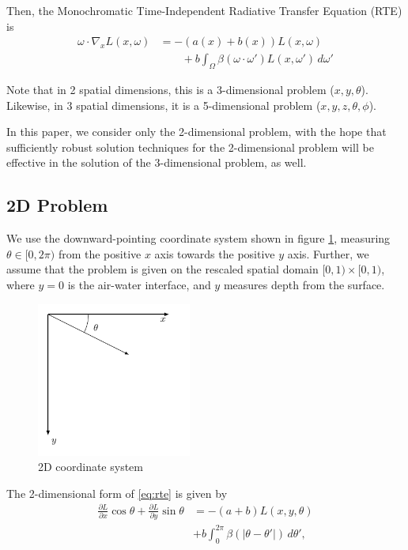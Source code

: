\documentclass[10pt]{article}
\newcommand\abs[1]{\left| #1 \right|}
\newcommand\pd[2]{\frac{\partial #1}{\partial #2}}
\begin{document}
\begin{multicols}{2}
Then, the Monochromatic Time-Independent Radiative Transfer Equation (RTE) is
\begin{equation}
    \tag{RTE}
    \label{eq:rte}
    \begin{aligned}
        \omega \cdot \nabla_x L(x,\omega) &= -(a(x) + b(x)) L(x,\omega) \\
        &\qquad + b \int_\Omega \beta(\omega \cdot \omega') L(x,\omega')\, d\omega'
    \end{aligned}
\end{equation}

Note that in 2 spatial dimensions, this is a 3-dimensional problem ($x,y,\theta$).
Likewise, in 3 spatial dimensions, it is a 5-dimensional problem ($x,y,z,\theta,\phi$).

In this paper, we consider only the 2-dimensional problem, with the hope that sufficiently robust solution techniques for the 2-dimensional problem will be effective in the solution of the 3-dimensional problem, as well.

\subsection{2D Problem}
\label{sec:2d}
We use the downward-pointing coordinate system shown in figure \ref{fig:coords}, measuring $\theta \in [0,2\pi)$ from the positive $x$ axis towards the positive $y$ axis.
Further, we assume that the problem is given on the rescaled spatial domain $[0,1) \times [0,1)$, where $y=0$ is the air-water interface, and $y$ measures depth from the surface.

\begin{figure}[H]
    \centering
    \includegraphics[width=2in]{2d_coords}
    \caption{2D coordinate system}
    \label{fig:coords}
\end{figure}

The 2-dimensional form of \eqref{eq:rte} is given by
\begin{equation}
    \begin{aligned}
        \pd{L}{x} \cos\theta + \pd{L}{y} \sin\theta
        &= -(a+b)L(x,y,\theta) \\
        &+ b\int_0^{2\pi} \beta(\abs{\theta-\theta'})\,d\theta',
    \end{aligned}
    \label{eq:rte2d}
\end{equation}


\end{multicols}
\end{document}
